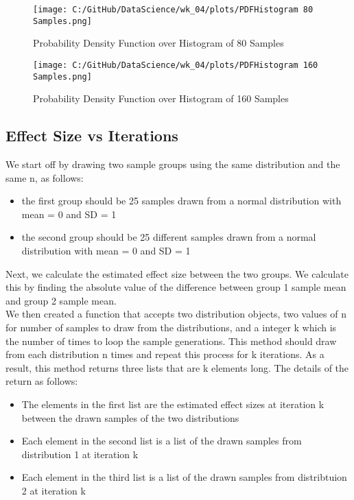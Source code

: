 \documentclass[a4paper,twocolumn]{article}
\begin{document}
\newpage %

\begin{figure}[htbp]
    \centering
    \begin{minipage}{0.45\textwidth}
        \centering
        \texttt{[image: C:/GitHub/DataScience/wk\_04/plots/PDFHistogram 80 Samples.png]}
        \caption{Probability Density Function over Histogram of 80 Samples} 
    \end{minipage} 

    \begin{minipage}{0.45\textwidth}
        \centering
        \texttt{[image: C:/GitHub/DataScience/wk\_04/plots/PDFHistogram 160 Samples.png]}
        \caption{Probability Density Function over Histogram of 160 Samples} 
    \end{minipage}
\end{figure}

\subsection{Effect Size vs Iterations}

We start off by drawing two sample groups using the same distribution and the same n, as follows:
\begin{itemize}
    \item the first group should be 25 samples drawn from a normal distribution with mean = 0 and SD = 1
    \item the second group should be 25 different samples drawn from a normal distribution with mean = 0 and SD = 1
\end{itemize}

Next, we calculate the estimated effect size between the two groups. We calculate this by finding the absolute 
value of the difference between group 1 sample mean and group 2 sample mean. \\

We then created a function that accepts two distribution objects, two values of n for number of samples to draw from 
the distributions, and a integer k which is the number of times to loop the sample generations. This method should 
draw from each distribution n times and repeat this process for k iterations. As a result, this method returns 
three lists that are k elements long. The details of the return as follows:

\begin{itemize}
    \item The elements in the first list are the estimated effect sizes at iteration k between the drawn samples of 
    the two distributions
    \item Each element in the second list is a list of the drawn samples from distribution 1 at iteration k
    \item Each element in the third list is a list of the drawn samples from distribtuion 2 at iteration k
\end{itemize}
\end{document}
